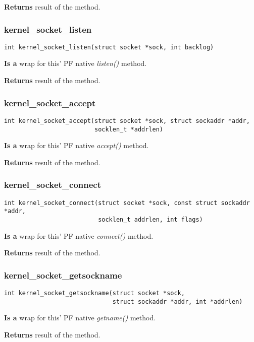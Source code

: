 \documentclass[12pt,a4paper]{article}
\begin{document}
{\bf Returns} result of the method.

\subsubsection{kernel\_socket\_listen}
\label{sec:kernel_socket_kernel_socket_listen}
\begin{verbatim}
int kernel_socket_listen(struct socket *sock, int backlog)
\end{verbatim}
{\bf Is a} wrap for this' PF native {\it listen()} method.

{\bf Returns} result of the method.

\subsubsection{kernel\_socket\_accept}
\label{sec:kernel_socket_kernel_socket_accept}
\begin{verbatim}
int kernel_socket_accept(struct socket *sock, struct sockaddr *addr,
                         socklen_t *addrlen)
\end{verbatim}
{\bf Is a} wrap for this' PF native {\it accept()} method.

{\bf Returns} result of the method.


\subsubsection{kernel\_socket\_connect}
\label{sec:kernel_socket_kernel_socket_connect}
\begin{verbatim}
int kernel_socket_connect(struct socket *sock, const struct sockaddr *addr,
                          socklen_t addrlen, int flags)
\end{verbatim}
{\bf Is a} wrap for this' PF native {\it connect()} method.

{\bf Returns} result of the method.


\subsubsection{kernel\_socket\_getsockname}
\label{sec:kernel_socket_kernel_socket_getsockname}
\begin{verbatim}
int kernel_socket_getsockname(struct socket *sock,
                              struct sockaddr *addr, int *addrlen)
\end{verbatim}
{\bf Is a} wrap for this' PF native {\it getname()} method.

{\bf Returns} result of the method.
\end{document}
